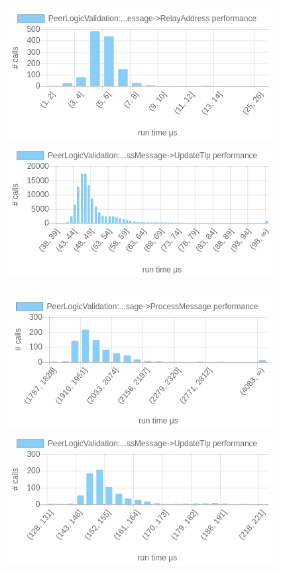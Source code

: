 \documentclass{article}
\begin{document}
\includegraphics[width=7cm]{images/mumbai/chartPeerLogicValidation_3A_3AProcessMessages-_3EProcessMessage-_3ERelayAddress.png}
\includegraphics[width=7cm]{images/mumbai/chartPeerLogicValidation_3A_3AProcessMessages-_3EProcessMessage-_3EUpdateTip.png}

\includegraphics[width=7cm]{images/mumbai/chartPeerLogicValidation_3A_3AProcessMessages-_3EProcessMessage-_3EProcessMessage.png}
\includegraphics[width=7cm]{images/mumbai/chartPeerLogicValidation_3A_3AProcessMessages-_3EProcessMessage-_3EProcessMessage-_3EUpdateTip.png}




\end{document}

